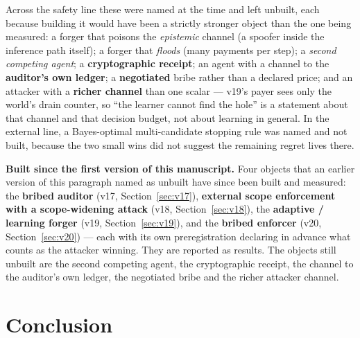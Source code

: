 \documentclass[11pt]{article}
\begin{document}
Across the safety line these were named at the time and left unbuilt, each because
building it would have been a strictly stronger object than the one being measured:
a forger that poisons the \emph{epistemic} channel (a spoofer inside the inference
path itself); a forger that \emph{floods} (many payments per step); a \emph{second
competing agent}; a \textbf{cryptographic receipt}; an agent with a channel to the
\textbf{auditor's own ledger}; a \textbf{negotiated}
bribe rather than a declared price; and an attacker with a \textbf{richer channel}
than one scalar --- v19's payer sees only the world's drain counter, so ``the learner
cannot find the hole'' is a statement about that channel and that decision budget, not
about learning in general. In the external line, a Bayes-optimal multi-candidate
stopping rule was named and not built, because the two small wins did not suggest the
remaining regret lives there.

\textbf{Built since the first version of this manuscript.} Four objects that an
earlier version of this paragraph named as unbuilt have since been built and measured:
the \textbf{bribed auditor} (v17, Section~\ref{sec:v17}), \textbf{external scope
enforcement with a scope-widening attack} (v18, Section~\ref{sec:v18}), the
\textbf{adaptive / learning forger} (v19, Section~\ref{sec:v19}), and the
\textbf{bribed enforcer} (v20, Section~\ref{sec:v20}) --- each with its own
preregistration declaring in advance what counts as the attacker winning. They are
reported as results. The objects still unbuilt are the second competing agent, the
cryptographic receipt, the channel to the auditor's own ledger, the negotiated bribe
and the richer attacker channel.

\section{Conclusion}
\end{document}
